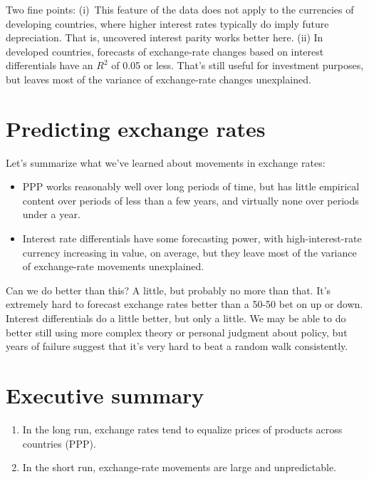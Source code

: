 Two fine points:  (i)~This feature of the data does not apply to
the currencies of developing countries, where higher interest rates
typically do imply future depreciation.
That is, uncovered interest parity   works better here.
(ii) In developed countries, forecasts of exchange-rate changes based on interest differentials have an $R^2$ of 0.05 or less.
That's still useful for investment purposes,
but leaves most of the variance of exchange-rate changes unexplained.


\section{Predicting exchange rates}

Let's summarize what we've learned about movements in exchange rates:
%
\begin{itemize}
\item PPP works reasonably well over long periods of time,
but has little empirical content over periods of less than a few years,
and virtually none over periods under a year.

\item Interest rate differentials have some forecasting power,
with high-interest-rate currency increasing in value, on average,
but they leave most of the variance of exchange-rate movements
 unexplained.
\end{itemize}
%
Can we do better than this?
A little, but probably no more than that.
It's extremely hard to forecast exchange rates better than
a 50-50 bet on up or down.
Interest differentials do a little better, but only a little. We may be able to do better still
using more complex theory or personal judgment about policy,
but years of failure suggest that
it's very hard to beat a random walk consistently.



\section*{Executive summary}

\begin{enumerate}
\item In the long run, exchange rates tend to
equalize prices of products across countries (PPP).

\item In the short run, exchange-rate movements are large
and unpredictable.
\end{enumerate}


